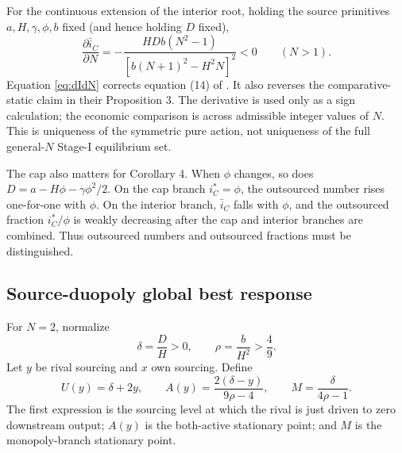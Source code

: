 For the continuous extension of the interior root, holding the source primitives
\(a,H,\gamma,\phi,b\) fixed (and hence holding \(D\) fixed),
\begin{equation}
\frac{\partial\bar i_C}{\partial N}
=
-
\frac{HDb(N^2-1)}
{\left[b(N+1)^2-H^2N\right]^2}
<0
\qquad(N>1).
\label{eq:dIdN}
\end{equation}
Equation \eqref{eq:dIdN} corrects equation (14) of \cite{ShyStenbacka2005}.  It also reverses the comparative-static claim in their Proposition 3.  The derivative is used only as a sign calculation; the economic comparison is across admissible integer values of \(N\).  This is uniqueness of the symmetric pure action, not uniqueness of the full general-\(N\) Stage-I equilibrium set.

The cap also matters for Corollary 4.  When \(\phi\) changes, so does
\(D=a-H\phi-\gamma\phi^2/2\).  On the cap branch \(i_C^*=\phi\), the outsourced number rises one-for-one with \(\phi\).  On the interior branch, \(\bar i_C\) falls with \(\phi\), and the outsourced fraction \(i_C^*/\phi\) is weakly decreasing after the cap and interior branches are combined.  Thus outsourced numbers and outsourced fractions must be distinguished.

\subsection{Source-duopoly global best response}

For \(N=2\), normalize
\begin{equation}
\delta=\frac{D}{H}>0,
\qquad
\rho=\frac{b}{H^2}>\frac49 .
\label{eq:normalized}
\end{equation}
Let \(y\) be rival sourcing and \(x\) own sourcing.  Define
\begin{equation}
U(y)=\delta+2y,\qquad
A(y)=\frac{2(\delta-y)}{9\rho-4},\qquad
M=\frac{\delta}{4\rho-1}.
\label{eq:BR-components}
\end{equation}
The first expression is the sourcing level at which the rival is just driven to zero downstream output; \(A(y)\) is the both-active stationary point; and \(M\) is the monopoly-branch stationary point.

